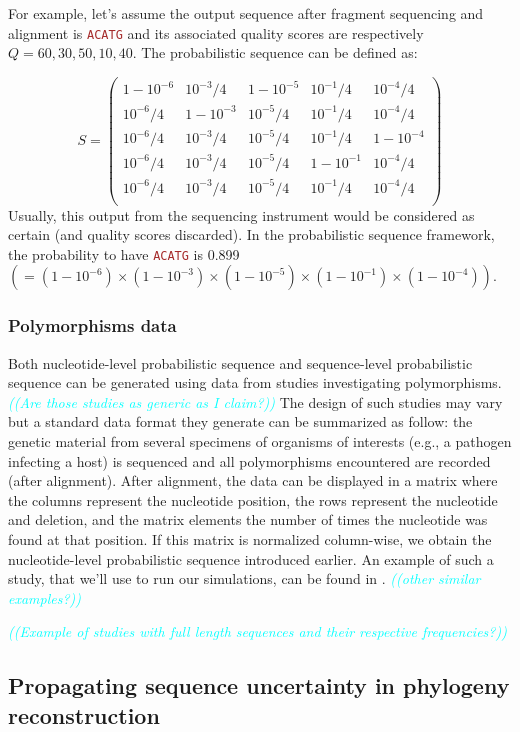 \documentclass[10pt]{article}
\newcommand{\comment}[1]{\textsl{\textcolor{cyan}{((#1))}}}
\newcommand{\sq}[1]{\texttt{\textcolor{brown}{#1}}}
\newcommand{\nlps}{nucleotide-level probabilistic sequence\xspace}
\newcommand{\slps}{sequence-level probabilistic sequence\xspace}
\begin{document}
For example, let's assume the output sequence after fragment sequencing and alignment is \sq{ACATG} and its associated quality scores are respectively $Q=60,30,50,10,40$. The probabilistic sequence can be defined as:

$$
S = 
\begin{pmatrix}
1-10^{-6} & 10^{-3}/4  & 1-10^{-5} & 10^{-1}/4 & 10^{-4}/4  \\
10^{-6}/4 & 1-10^{-3}  & 10^{-5}/4 & 10^{-1}/4 & 10^{-4}/4  \\
10^{-6}/4 & 10^{-3}/4  & 10^{-5}/4 & 10^{-1}/4 & 1-10^{-4} \\
10^{-6}/4 & 10^{-3}/4  & 10^{-5}/4 & 1-10^{-1} & 10^{-4}/4\\
10^{-6}/4 & 10^{-3}/4  & 10^{-5}/4 & 10^{-1}/4 & 10^{-4}/4 \\
\end{pmatrix}
$$
Usually, this output from the sequencing instrument would be considered as certain (and quality scores discarded). In the probabilistic sequence framework, the probability to have \sq{ACATG} is 0.899 ${\displaystyle(=(1-10^{-6})\times (1-10^{-3})\times (1-10^{-5})\times (1-10^{-1})\times (1-10^{-4}))}$.

\subsubsection{Polymorphisms data}
Both \nlps and \slps can be generated using data from studies investigating polymorphisms.
\comment{Are those studies as generic as I claim?}
The design of such studies may vary but a standard data format they generate can be summarized as follow: the genetic material from several specimens of organisms of interests (e.g., a pathogen infecting a host) is sequenced and all polymorphisms encountered are recorded (after alignment). 
After alignment, the data can be displayed in a matrix where the columns represent the nucleotide position, the rows represent the nucleotide and deletion, and the matrix elements the number of times the nucleotide was found at that position.
If this matrix is normalized column-wise, we obtain the \nlps introduced earlier. 
An example of such a study, that we'll use to run our simulations, can be found in \cite{Zanini:2015}. \comment{other similar examples?}

\comment{Example of studies with full length sequences and their respective frequencies?}


\subsection{Propagating sequence uncertainty in phylogeny reconstruction}
\end{document}
